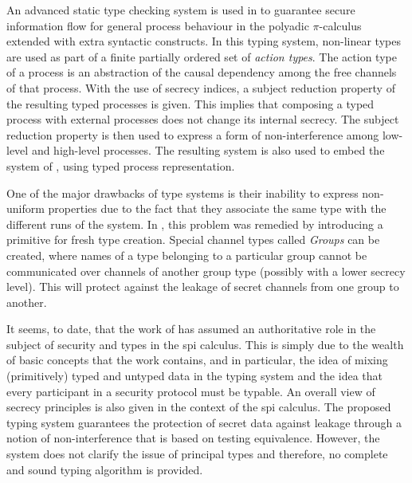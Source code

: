\documentclass[10pt,a4paper,final,oneside,fleqn]{book}
\begin{document}
An advanced static type checking system is used in \cite{honda1} to guarantee secure information flow for general process behaviour in the polyadic $\pi$-calculus extended with extra syntactic constructs.  In this typing system, non-linear types are used as part of a finite partially ordered set of {\itshape action types\/}.  The action type of a process is an abstraction of the causal dependency among the free channels of that process.  With the use of secrecy indices, a subject reduction property of the resulting typed processes is given.  This implies that composing a typed process with external processes does not change its internal secrecy.  The subject reduction property is then used to express a form of non-interference among low-level and high-level processes.  The resulting system is also used to embed the system of \cite{volpano1}, using typed process representation.

One of the major drawbacks of type systems is their inability to express non-uniform properties due to the fact that they associate the same type with the different runs of the system.  In \cite{cardelli2}, this problem was remedied by introducing a primitive for fresh type creation.  Special channel types called {\itshape Groups\/} can be created, where names of a type belonging to a particular group cannot be communicated over channels of another group type (possibly with a lower secrecy level).  This will protect against the leakage of secret channels from one group to another.

It seems, to date, that the work of \cite{abadi3} has assumed an authoritative role in the subject of security and types in the spi calculus.  This is simply due to the wealth of basic concepts that the work contains, and in particular, the idea of mixing (primitively) typed and untyped data in the typing system and the idea that every participant in a security protocol must be typable.  An overall view of secrecy principles is also given in the context of the spi calculus.  The proposed typing system guarantees the protection of secret data against leakage through a notion of non-interference that is based on testing equivalence.  However, the system does not clarify the issue of principal types and therefore, no complete and sound typing algorithm is provided.
\end{document}
